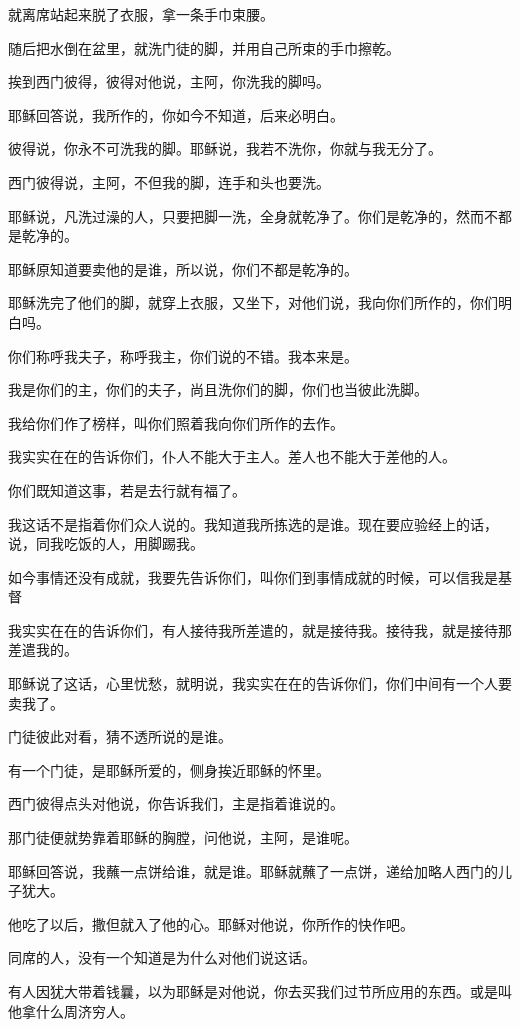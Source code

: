 \documentclass[12pt,oneside]{book}
\begin{document}
就离席站起来脱了衣服，拿一条手巾束腰。

随后把水倒在盆里，就洗门徒的脚，并用自己所束的手巾擦乾。

挨到西门彼得，彼得对他说，主阿，你洗我的脚吗。

耶稣回答说，我所作的，你如今不知道，后来必明白。

彼得说，你永不可洗我的脚。耶稣说，我若不洗你，你就与我无分了。

西门彼得说，主阿，不但我的脚，连手和头也要洗。

耶稣说，凡洗过澡的人，只要把脚一洗，全身就乾净了。你们是乾净的，然而不都是乾净的。

耶稣原知道要卖他的是谁，所以说，你们不都是乾净的。

耶稣洗完了他们的脚，就穿上衣服，又坐下，对他们说，我向你们所作的，你们明白吗。

你们称呼我夫子，称呼我主，你们说的不错。我本来是。

我是你们的主，你们的夫子，尚且洗你们的脚，你们也当彼此洗脚。

我给你们作了榜样，叫你们照着我向你们所作的去作。

我实实在在的告诉你们，仆人不能大于主人。差人也不能大于差他的人。

你们既知道这事，若是去行就有福了。

我这话不是指着你们众人说的。我知道我所拣选的是谁。现在要应验经上的话，说，同我吃饭的人，用脚踢我。

如今事情还没有成就，我要先告诉你们，叫你们到事情成就的时候，可以信我是基督

我实实在在的告诉你们，有人接待我所差遣的，就是接待我。接待我，就是接待那差遣我的。

耶稣说了这话，心里忧愁，就明说，我实实在在的告诉你们，你们中间有一个人要卖我了。

门徒彼此对看，猜不透所说的是谁。

有一个门徒，是耶稣所爱的，侧身挨近耶稣的怀里。

西门彼得点头对他说，你告诉我们，主是指着谁说的。

那门徒便就势靠着耶稣的胸膛，问他说，主阿，是谁呢。

耶稣回答说，我蘸一点饼给谁，就是谁。耶稣就蘸了一点饼，递给加略人西门的儿子犹大。

他吃了以后，撒但就入了他的心。耶稣对他说，你所作的快作吧。

同席的人，没有一个知道是为什么对他们说这话。

有人因犹大带着钱曩，以为耶稣是对他说，你去买我们过节所应用的东西。或是叫他拿什么周济穷人。
\end{document}
